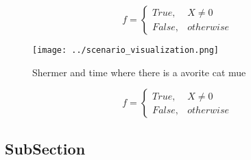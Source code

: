 \documentclass[a4paper]{article}
\begin{document}
\begin{equation}   f =
\begin{cases} True, & X \neq 0\\
False, & otherwise
\end{cases}
\end{equation}

\begin{figure}
\centering
\texttt{[image: ../scenario\_visualization.png]}
\caption{Shermer and time where there is a avorite cat mue
}
\end{figure}
 
\begin{equation}   f =
\begin{cases} True, & X \neq 0\\
False, & otherwise
\end{cases}
\end{equation}

\subsection{SubSection}
\end{document}
